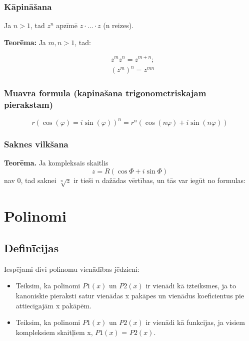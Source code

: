 \documentclass{article}
\begin{document}
\subsubsection{Kāpināšana}

Ja $n>1$, tad $z^n$ apzīmē $z\cdot\ldots\cdot z$ (n reizes).

\textbf{Teorēma:} Ja $m,n>1$, tad:

\begin{align}
	&z^m z^n = z^{m+n}; \\
	&(z^m)^n=z^{mn}
\end{align}


\subsubsection{Muavrā formula (kāpināšana trigonometriskajam pierakstam)}

\begin{equation}
	r(\cos(\varphi) = i\sin(\varphi))^n=r^n(\cos(n\varphi)+i\sin(n\varphi))
\end{equation}

\subsubsection{Saknes vilkšana}

\textbf{Teorēma.} Ja kompleksais skaitlis
\begin{equation}
	z = R(\cos\varPhi + i \sin \varPhi)
\end{equation}
nav 0, tad saknei $\sqrt[n]{z}$ ir tieši $n$ dažādas vērtības, un tās var iegūt no formulas:


\section{Polinomi}

\subsection{Definīcijas}

Iespējami divi polinomu vienādības jēdzieni:
\begin{itemize}
	\item Teiksim, ka polinomi $P1(x)$ un $P2(x)$ ir vienādi kā izteiksmes, ja to kanoniskie pieraksti satur vienādas x pakāpes un vienādus koeficientus pie attiecīgajām x pakāpēm.
	\item Teiksim, ka polinomi $P1(x)$ un $P2(x)$ ir vienādi kā funkcijas, ja visiem kompleksiem skaitļiem x, $P1(x)$ = $P2(x)$.
\end{itemize}
\end{document}
